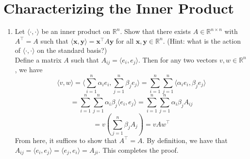 \documentclass{article}
\begin{document}
\section{Characterizing the Inner Product}
\begin{enumerate}[label=\arabic*.]
	\item Let $\langle \cdot, \cdot \rangle$ be an inner product on $\mathbb{R}^n$. Show that there exists $A \in \mathbb{R}^{n\times n}$ with $A^\top = A$ such that $\langle \textbf{x}, \textbf{y} \rangle = \textbf{x}^\top A \textbf{y}$ for all $\textbf{x}, \textbf{y} \in \mathbb{R}^n$.  (Hint: what is the action of $\langle \cdot, \cdot \rangle$ on the standard basis?) \\
	{\color{blue} Define a matrix $A$ such that $A_{ij} = \langle e_i, e_j \rangle$. Then for any two vectors $v, w \in \mathbb{R}^n$, we have $$\langle v, w\rangle = \langle \sum\limits_{i=1}^n \alpha_ie_i, \sum\limits_{j=1}^n \beta_je_j\rangle =\sum\limits_{i=1}^n\sum\limits_{j=1}^n\langle \alpha_ie_i, \beta_je_j\rangle$$ $$=\sum\limits_{i=1}^n\sum\limits_{j=1}^n\alpha_i\beta_j\langle e_i,e_j\rangle = \sum\limits_{i=1}^n\sum\limits_{j=1}^n\alpha_i\beta_jA_{ij}$$ $$= v(\sum\limits_{j=1}^n \beta_jA_j) = vAw^{\top}$$ From here, it suffices to show that $A^{\top} = A$. By definition, we have that $A_{ij} = \langle e_i, e_j \rangle = \langle e_j, e_i \rangle = A_{ji}$. This completes the proof.}
\end{enumerate}
\end{document}
